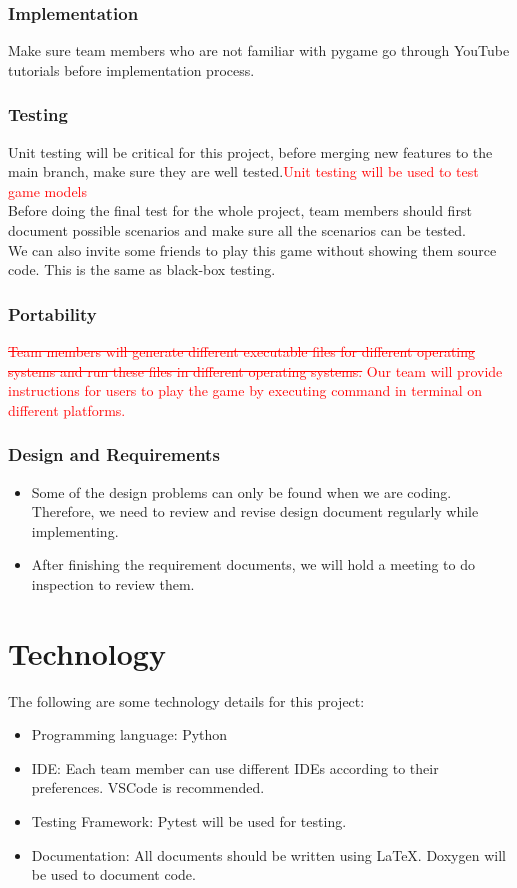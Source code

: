 \documentclass[12pt]{article}
\begin{document}
\subsubsection{Implementation}
Make sure team members who are not familiar 
with pygame go through YouTube tutorials
before implementation process.
\subsubsection{Testing}
Unit testing will be critical for this project, before merging new features to the 
main branch, make sure they are well tested.\textcolor{red}{Unit testing will be 
used to test game models}\\
Before doing the final test for the whole
project, team members should first document
possible scenarios and make sure all the 
scenarios can be tested.\\
We can also invite some friends to play 
this game without showing them source code.
This is the same as black-box testing. 
\subsubsection{Portability}
\textcolor{red}{\st{Team members will generate different executable
files for different operating systems and run these files in different operating systems.} Our team will provide instructions for users to play the game by 
executing command in terminal on different platforms.}
\subsubsection{Design and Requirements}
\begin{itemize}
\item Some of the design problems can only
be found when we are coding. Therefore, 
we need to review and revise design document regularly while implementing.
\item After finishing the requirement documents, we
will hold a meeting to do inspection to review them. 
\end{itemize}
\section{Technology}
The following are some technology details 
for this project:
\begin{itemize}
\item Programming language: Python
\item IDE: Each team member can use different IDEs according to their preferences. VSCode is recommended.
\item Testing Framework: Pytest will be 
used for testing.
\item Documentation: All documents should
be written using \LaTeX. Doxygen will be 
used to document code. 
\end{itemize}
\end{document}
